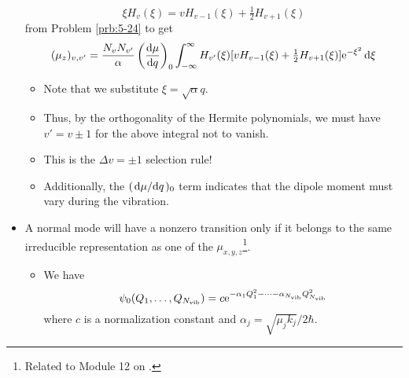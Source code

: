 \documentclass[../notes.tex]{subfiles}
\begin{document}
\begin{itemize}
\begin{equation*}
        \xi H_v(\xi) = vH_{v-1}(\xi)+\tfrac{1}{2}H_{v+1}(\xi)
    \end{equation*}
    from Problem \ref{prb:5-24} to get
    \begin{equation*}
        (\mu_z)_{v,v'} = \frac{N_vN_{v'}}{\alpha}\left( \dv{\mu}{q} \right)_0\int_{-\infty}^\infty H_{v'}(\xi)[vH_{v-1}(\xi)+\tfrac{1}{2}H_{v+1}(\xi)]\e[-\xi^2]\dd{\xi}
    \end{equation*}
    \begin{itemize}
        \item Note that we substitute $\xi=\sqrt{\alpha}q$.
        \item Thus, by the orthogonality of the Hermite polynomials, we must have $v'=v\pm 1$ for the above integral not to vanish.
        \item This is the $\Delta v=\pm 1$ selection rule!
        \item Additionally, the $(\dv*{\mu}{q})_0$ term indicates that the dipole moment must vary during the vibration.
    \end{itemize}
    \item A normal mode will have a nonzero transition only if it belongs to the same irreducible representation as one of the $\mu_{x,y,z}$\footnote{Related to Module 12 on \textcite[49-50]{bib:IChemNotes}.}.
    \begin{itemize}
        \item We have
        \begin{equation*}
            \psi_0(Q_1,\dots,Q_{N_\text{vib}}) = c\e[-\alpha_1Q_1^2-\cdots-\alpha_{N_\text{vib}}Q_{N_\text{vib}}^2]
        \end{equation*}
        where $c$ is a normalization constant and $\alpha_j=\sqrt{\mu_jk_j}/2\hbar$.
        \begin{itemize}

\end{itemize}
\end{itemize}
\end{itemize}
\end{document}
